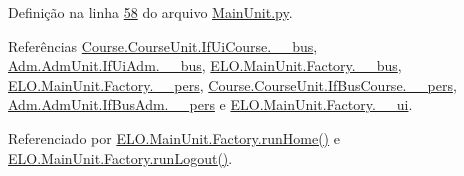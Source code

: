 Definição na linha \hyperlink{MainUnit_8py_source_l00058}{58} do arquivo \hyperlink{MainUnit_8py_source}{Main\-Unit.\-py}.



Referências \hyperlink{CourseUnit_8py_source_l00025}{Course.\-Course\-Unit.\-If\-Ui\-Course.\-\_\-\-\_\-bus}, \hyperlink{AdmUnit_8py_source_l00031}{Adm.\-Adm\-Unit.\-If\-Ui\-Adm.\-\_\-\-\_\-bus}, \hyperlink{MainUnit_8py_source_l00038}{E\-L\-O.\-Main\-Unit.\-Factory.\-\_\-\-\_\-bus}, \hyperlink{MainUnit_8py_source_l00039}{E\-L\-O.\-Main\-Unit.\-Factory.\-\_\-\-\_\-pers}, \hyperlink{CourseUnit_8py_source_l00051}{Course.\-Course\-Unit.\-If\-Bus\-Course.\-\_\-\-\_\-pers}, \hyperlink{AdmUnit_8py_source_l00061}{Adm.\-Adm\-Unit.\-If\-Bus\-Adm.\-\_\-\-\_\-pers} e \hyperlink{MainUnit_8py_source_l00037}{E\-L\-O.\-Main\-Unit.\-Factory.\-\_\-\-\_\-ui}.



Referenciado por \hyperlink{classELO_1_1MainUnit_1_1Factory_a766943202ba781821cf749ca0fb133ba}{E\-L\-O.\-Main\-Unit.\-Factory.\-run\-Home()} e \hyperlink{classELO_1_1MainUnit_1_1Factory_aa26c51486ba65030399897a6e3b4f4f1}{E\-L\-O.\-Main\-Unit.\-Factory.\-run\-Logout()}.


